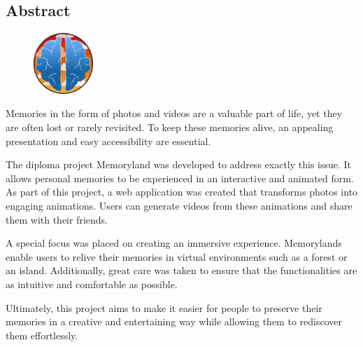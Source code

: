 \begin{spacing}{1}
    \chapter*{Abstract}
\end{spacing}
\begin{figure}
    \begin{center}
      \includegraphics[width=0.2\textwidth]{pics/memoryland-logo.png}
    \end{center}
\end{figure}

Memories in the form of photos and videos are a valuable part of life, yet they are often 
lost or rarely revisited. To keep these memories alive, an appealing presentation and easy 
accessibility are essential.

The diploma project Memoryland was developed to address exactly this issue. It allows 
personal memories to be experienced in an interactive and animated form. As part of 
this project, a web application was created that transforms photos into engaging 
animations. Users can generate videos from these animations and share them with their friends.

A special focus was placed on creating an immersive experience. Memorylands enable 
users to relive their memories in virtual environments such as a forest or an island. 
Additionally, great care was taken to ensure that the functionalities are as intuitive
and comfortable as possible.

Ultimately, this project aims to make it easier for people to preserve their memories 
in a creative and entertaining way while allowing them to rediscover them effortlessly.


